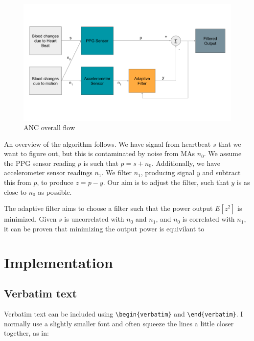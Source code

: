 \documentclass[12pt,a4paper,twoside,openright]{report}
\begin{document}
\begin{figure}[tbh]
	\centerline{\includegraphics[width=\textwidth]{figs/ANC-concept.png}}
\caption{ANC overall flow}
\label{epsfig}
\end{figure}

An overview of the algorithm follows. We have signal from heartbeat \(s\) that
we want to figure out, but this is contaminated by noise from MAs \(n_0\).
We assume the PPG sensor reading \(p\) is such that \(p=s+n_0\). Additionally,
we have accelerometer sensor readings \(n_1\). We filter \(n_1\), producing
signal \(y\) and subtract this from \(p\), to produce \(z=p-y\). Our aim is to
adjust the filter, such that \(y\) is as close to \(n_0\) as possible. 

The adaptive filter aims to choose a filter such that the power output 
\(E[z^2]\) is minimized. Given \(s\) is uncorrelated with \(n_0\) and \(n_1\), and \(n_0\)
is correlated with \(n_1\), it can be proven that minimizing the output
power is equivilant to 

\chapter{Implementation}

\section{Verbatim text}

Verbatim text can be included using \verb|\begin{verbatim}| and
\verb|\end{verbatim}|. I normally use a slightly smaller font and
often squeeze the lines a little closer together, as in:
\end{document}
